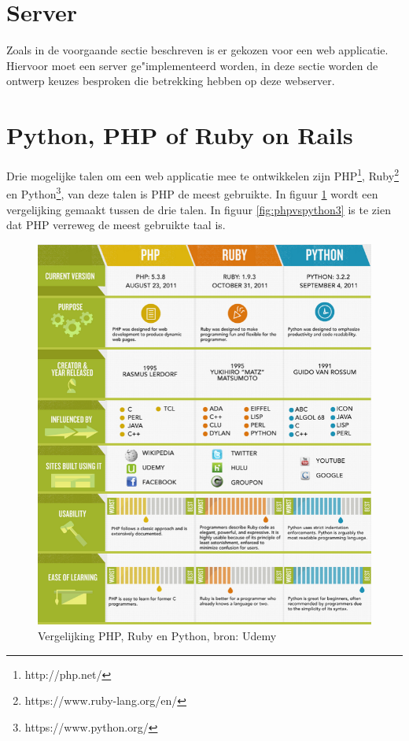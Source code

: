\documentclass[twoside,openright]{uva-bachelor-thesis}
\begin{document}
	\section{Server}
		Zoals in de voorgaande sectie beschreven is er gekozen voor een web applicatie. Hiervoor moet een server ge"implementeerd worden, in deze sectie worden de ontwerp keuzes besproken die betrekking hebben op deze webserver.
		\section{Python, PHP of Ruby on Rails}
			Drie mogelijke talen om een web applicatie mee te ontwikkelen zijn PHP\footnote{http://php.net/}, Ruby\footnote{https://www.ruby-lang.org/en/} en Python\footnote{https://www.python.org/}, van deze talen is PHP de meest gebruikte. In figuur \ref{fig:phpvspython} wordt een vergelijking gemaakt tussen de drie talen. In figuur \ref{fig:phpvspython3} is te zien dat PHP verreweg de meest gebruikte taal is.
			\begin{figure}[!htb]
				\centering
				\includegraphics[scale=0.9]{./img/phpvspython.png}
				\caption{Vergelijking PHP, Ruby en Python, bron: Udemy}
				\label{fig:phpvspython}
			\end{figure} 
\end{document}
